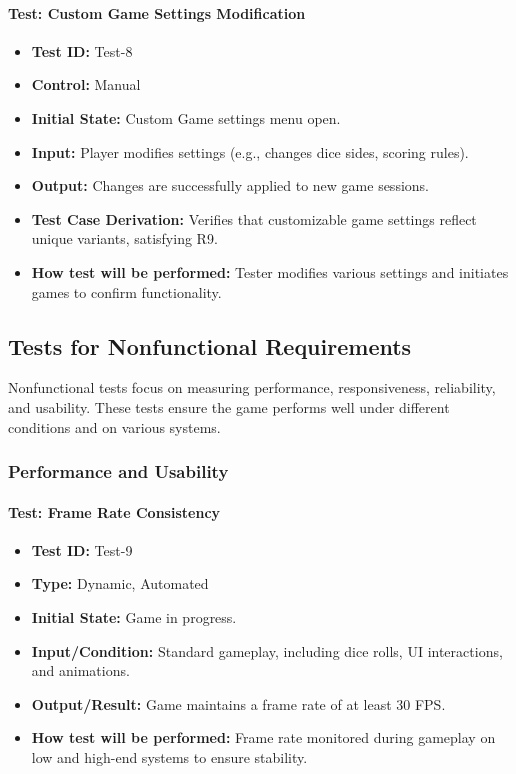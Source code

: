 \documentclass[12pt, titlepage]{article}
\begin{document}
\paragraph{Test: Custom Game Settings Modification}
\begin{itemize}
    \item \textbf{Test ID:} Test-8
    \item \textbf{Control:} Manual
    \item \textbf{Initial State:} Custom Game settings menu open.
    \item \textbf{Input:} Player modifies settings (e.g., changes dice sides, scoring rules).
    \item \textbf{Output:} Changes are successfully applied to new game sessions.
    \item \textbf{Test Case Derivation:} Verifies that customizable game settings reflect unique variants, satisfying R9.
    \item \textbf{How test will be performed:} Tester modifies various settings and initiates games to confirm functionality.
\end{itemize}

\subsection{Tests for Nonfunctional Requirements}

Nonfunctional tests focus on measuring performance, responsiveness, reliability, and usability. These tests ensure the game performs well under different conditions and on various systems.

\subsubsection{Performance and Usability}

\paragraph{Test: Frame Rate Consistency}
\begin{itemize}
    \item \textbf{Test ID:} Test-9
    \item \textbf{Type:} Dynamic, Automated
    \item \textbf{Initial State:} Game in progress.
    \item \textbf{Input/Condition:} Standard gameplay, including dice rolls, UI interactions, and animations.
    \item \textbf{Output/Result:} Game maintains a frame rate of at least 30 FPS.
    \item \textbf{How test will be performed:} Frame rate monitored during gameplay on low and high-end systems to ensure stability.
\end{itemize}
\end{document}
